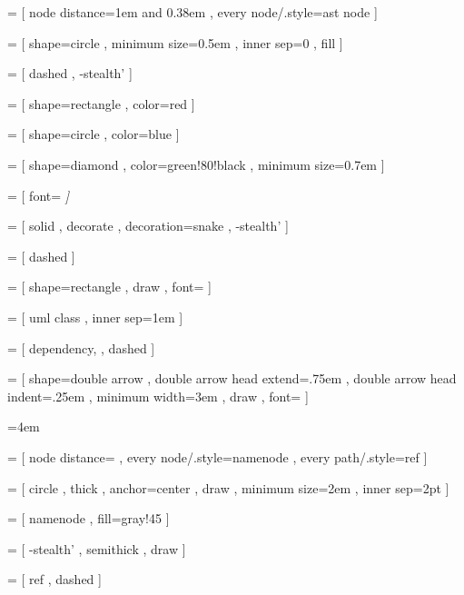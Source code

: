   = [ node distance=1em and 0.38em
    , every node/.style=ast node
    ]

  = [ shape=circle
    , minimum size=0.5em
    , inner sep=0
    , fill
    ]

  = [ dashed
    , -stealth'
    ]

  = [ shape=rectangle
    , color=red
    ]

  = [ shape=circle
    , color=blue
    ]

  = [ shape=diamond
    , color=green!80!black
    , minimum size=0.7em
    ]

  = [ font=\scriptsize\it
    ]
    
  = [ solid
    , decorate
    , decoration=snake
    , -stealth'
    ]

  = [ dashed
    ]

  = [ shape=rectangle
    , draw
    , font=\sf
    ]

  = [ uml class
    , inner sep=1em
    ]

  = [ dependency, 
    , dashed
    ]


\newcommand{\bluenode}{\tikz \node [ast node, blue, color=blue, text width=] {};}
\newcommand{\rednode}{\tikz \node [ast node, red, color=red, text width=] {};}
\newcommand{\greennode}{\tikz \node [ast node, green, color=green!80!black, text width=] {};}


  = [ shape=double arrow
    , double arrow head extend=.75em
    , double arrow head indent=.25em
    , minimum width=3em
    , draw
    , font=\sf
    ]


\newdimen\nodedistance
\nodedistance=4em

  = [ node distance=\nodedistance
    , every node/.style={namenode}
    , every path/.style={ref}
    ]


  = [ circle
    , thick
    , anchor=center
    , draw
    , minimum size=2em
    , inner sep=2pt
    ]

  = [ namenode
    , fill=gray!45
    ]

  = [ -stealth'
    , semithick
    , draw
    ]

  = [ ref
    , dashed
    ]

